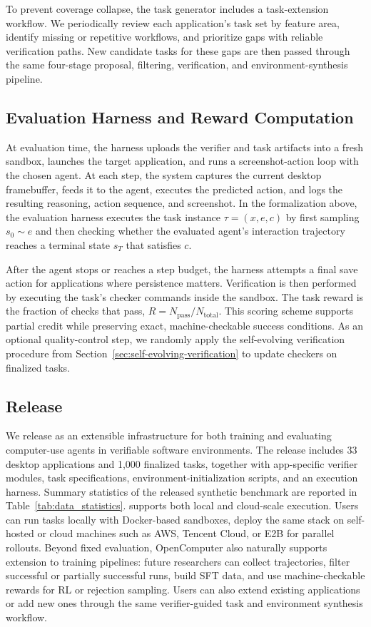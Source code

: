 To prevent coverage collapse, the task generator includes a task-extension workflow. We periodically review each application's task set by feature area, identify missing or repetitive workflows, and prioritize gaps with reliable verification paths. New candidate tasks for these gaps are then passed through the same four-stage proposal, filtering, verification, and environment-synthesis pipeline.

\subsection{Evaluation Harness and Reward Computation}

At evaluation time, the harness uploads the verifier and task artifacts into a fresh sandbox, launches the target application, and runs a screenshot-action
loop with the chosen agent. At each step, the system captures the current desktop framebuffer, feeds it to the agent, executes the predicted action, and
logs the resulting reasoning, action sequence, and screenshot.  In the formalization above, the evaluation harness executes the task instance $\tau = (x, e, c)$ by first sampling $s_0 \sim e$ and then checking whether the evaluated agent's interaction trajectory reaches a terminal state $s_T$ that satisfies
$c$.

After the agent stops or reaches a step budget, the harness attempts a final
save action for applications where persistence matters. Verification is then
performed by executing the task's checker commands inside the sandbox. The task reward is the fraction of checks that pass, $R = N_{\mathrm{pass}} / N_{\mathrm{total}}$. This scoring scheme supports partial credit while preserving exact, machine-checkable success conditions. As an optional quality-control step, we randomly apply the self-evolving verification procedure from Section~\ref{sec:self-evolving-verification} to update checkers on finalized tasks.



\subsection{\ours Release}
We release \ours as an extensible infrastructure for both training and evaluating computer-use agents in verifiable software environments. The release includes 33 desktop applications and 1,000 finalized tasks, together with app-specific verifier modules, task specifications, environment-initialization
scripts, and an execution harness. Summary statistics of the released synthetic benchmark are reported in Table~\ref{tab:data_statistics}. \ours supports both local and cloud-scale execution. Users can run tasks locally with Docker-based sandboxes, deploy the same stack on self-hosted or cloud machines such as AWS, Tencent Cloud, or E2B for parallel rollouts. Beyond fixed evaluation, OpenComputer also naturally supports extension to training pipelines: future researchers can collect trajectories, filter successful or partially successful runs, build SFT data, and use machine-checkable rewards for RL or rejection sampling. Users can also extend existing applications or add new ones through the same verifier-guided task and environment synthesis workflow.